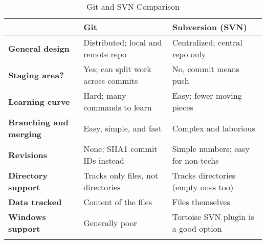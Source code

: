 \begin{longtable}{lll}
\toprule
&
\textbf{Git}
&
\textbf{Subversion (SVN)}
\\ \midrule
\textbf{General design}
&
Distributed; local and remote repo
&
Centralized; central repo only
\\ \midrule
\textbf{Staging area?}
&
Yes; can split work across commits
&
No, commit means push
\\ \midrule
\textbf{Learning curve}
&
Hard; many commands to learn
&
Easy; fewer moving pieces
\\ \midrule
\textbf{Branching and merging}
&
Easy, simple, and fast
&
Complex and laborious
\\ \midrule
\textbf{Revisions}
&
None; SHA1 commit IDs instead
&
Simple numbers; easy for non-techs
\\ \midrule
\textbf{Directory support}
&
Tracks only files, not directories
&
Tracks directories (empty ones too)
\\ \midrule
\textbf{Data tracked}
&
Content of the files
&
Files themselves
\\ \midrule
\textbf{Windows support}
&
Generally poor
&
Tortoise SVN plugin is a good option
\\
\bottomrule
\caption{Git and SVN Comparison}
\end{longtable}
